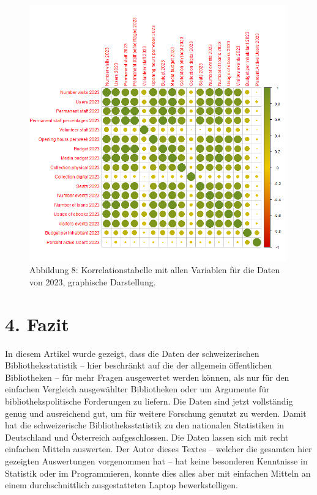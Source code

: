 \documentclass[a4paper,
fontsize=11pt,
oneside,
numbers=noperiodatend,
parskip=half-,
bibliography=totoc,
final
]{scrartcl}
\begin{document}
\begin{figure}
\centering
\includegraphics[width=0.99\textwidth]{img/Abbildung08.PNG}
\caption{Abbildung 8: Korrelationstabelle mit allen Variablen für die
Daten von 2023, graphische Darstellung.}
\end{figure}

\section{4. Fazit}\label{fazit}

In diesem Artikel wurde gezeigt, dass die Daten der schweizerischen
Bibliotheksstatistik -- hier beschränkt auf die der allgemein
öffentlichen Bibliotheken -- für mehr Fragen ausgewertet werden können,
als nur für den einfachen Vergleich ausgewählter Bibliotheken oder um
Argumente für bibliothekspolitische Forderungen zu liefern. Die Daten
sind jetzt vollständig genug und ausreichend gut, um für weitere
Forschung genutzt zu werden. Damit hat die schweizerische
Bibliotheksstatistik zu den nationalen Statistiken in Deutschland und
Österreich aufgeschlossen. Die Daten lassen sich mit recht einfachen
Mitteln auswerten. Der Autor dieses Textes -- welcher die gesamten hier
gezeigten Auswertungen vorgenommen hat -- hat keine besonderen
Kenntnisse in Statistik oder im Programmieren, konnte dies alles aber
mit einfachen Mitteln an einem durchschnittlich ausgestatteten Laptop
bewerkstelligen.
\end{document}
